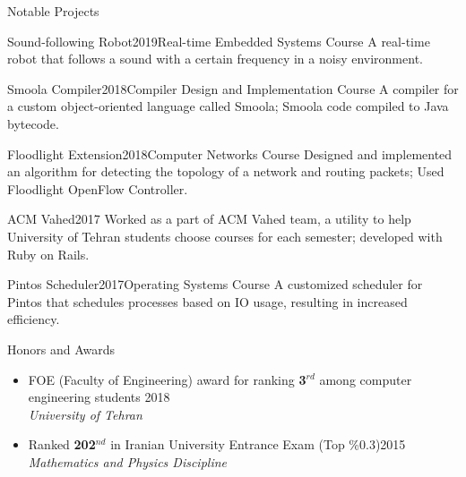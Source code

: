 \documentclass{resume}
\begin{document}
\begin{rSection}{Notable Projects}

\begin{rSubsection}{Sound-following Robot}{2019}{Real-time Embedded Systems Course}{}
{A real-time robot that follows a sound with a certain frequency in a noisy environment.}
\end{rSubsection}

\begin{rSubsection}{Smoola Compiler}{2018}{Compiler Design and Implementation Course}{}
{A compiler for a custom object-oriented language called Smoola; Smoola code compiled to Java bytecode.}
\end{rSubsection}

\begin{rSubsection}{Floodlight Extension}{2018}{Computer Networks Course}{}
{Designed and implemented an algorithm for detecting the topology of a network and routing packets; Used Floodlight OpenFlow Controller.}
\end{rSubsection}

\begin{rSubsection}{ACM Vahed}{2017}{}{}
{Worked as a part of ACM Vahed team, a utility to help University of Tehran students choose courses for each semester; developed with Ruby on Rails.}
\end{rSubsection}

\begin{rSubsection}{Pintos Scheduler}{2017}{Operating Systems Course}{}
{A customized scheduler for Pintos that schedules processes based on IO usage, resulting in increased efficiency.}
\end{rSubsection}

\end{rSection}


\begin{rSection}{Honors and Awards} 
\begin{itemize}
    \item FOE (Faculty of Engineering) award for ranking {\bf3$^{rd}$} among computer engineering students \hfill 2018
    \\ \textit{University of Tehran}
    \item Ranked {\bf202$^{nd}$} in Iranian University Entrance Exam (Top \%0.3)\hfill 2015
    \\ \textit{Mathematics and Physics Discipline}
\end{itemize}
\end{rSection}
\end{document}
